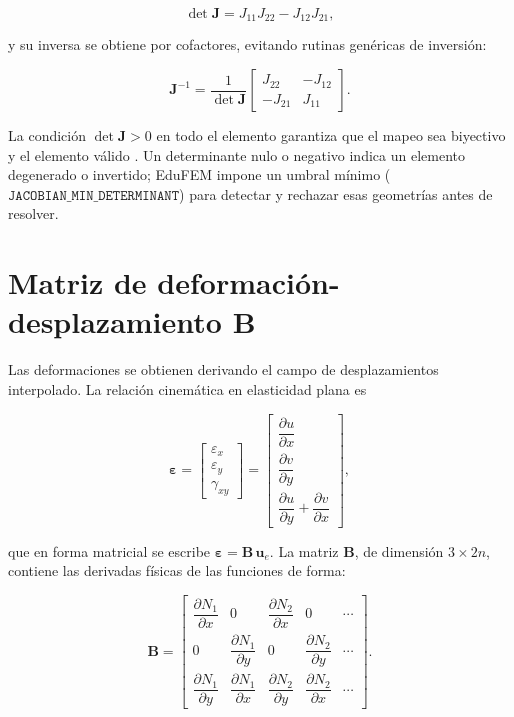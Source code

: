 \begin{equation}
\det\bm{J} = J_{11}J_{22} - J_{12}J_{21},
\label{eq:detJ}
\end{equation}

y su inversa se obtiene por cofactores, evitando rutinas genéricas de inversión:

\begin{equation}
\bm{J}^{-1} = \frac{1}{\det\bm{J}}
\begin{bmatrix}
J_{22} & -J_{12} \\
-J_{21} & J_{11}
\end{bmatrix}.
\label{eq:invJ}
\end{equation}

La condición $\det\bm{J} > 0$ en todo el elemento garantiza que el mapeo sea biyectivo y el elemento válido \autocite{bathe2014fem,cook2002concepts}. Un determinante nulo o negativo indica un elemento degenerado o invertido; EduFEM impone un umbral mínimo ($\texttt{JACOBIAN\_MIN\_DETERMINANT}$) para detectar y rechazar esas geometrías antes de resolver.

\section{Matriz de deformación-desplazamiento B}
\label{sec:matriz-b}

Las deformaciones se obtienen derivando el campo de desplazamientos interpolado. La relación cinemática en elasticidad plana es

\begin{equation}
\bm{\varepsilon} =
\begin{bmatrix} \varepsilon_x \\ \varepsilon_y \\ \gamma_{xy} \end{bmatrix}
=
\begin{bmatrix}
\dfrac{\partial u}{\partial x} \\[4pt]
\dfrac{\partial v}{\partial y} \\[4pt]
\dfrac{\partial u}{\partial y} + \dfrac{\partial v}{\partial x}
\end{bmatrix},
\label{eq:cinematica}
\end{equation}

que en forma matricial se escribe $\bm{\varepsilon} = \bm{B}\,\bm{u}_e$. La matriz $\bm{B}$, de dimensión $3 \times 2n$, contiene las derivadas físicas de las funciones de forma:

\begin{equation}
\bm{B} =
\begin{bmatrix}
\dfrac{\partial N_1}{\partial x} & 0 & \dfrac{\partial N_2}{\partial x} & 0 & \cdots \\[6pt]
0 & \dfrac{\partial N_1}{\partial y} & 0 & \dfrac{\partial N_2}{\partial y} & \cdots \\[6pt]
\dfrac{\partial N_1}{\partial y} & \dfrac{\partial N_1}{\partial x} & \dfrac{\partial N_2}{\partial y} & \dfrac{\partial N_2}{\partial x} & \cdots
\end{bmatrix}.
\label{eq:matriz-B}
\end{equation}

